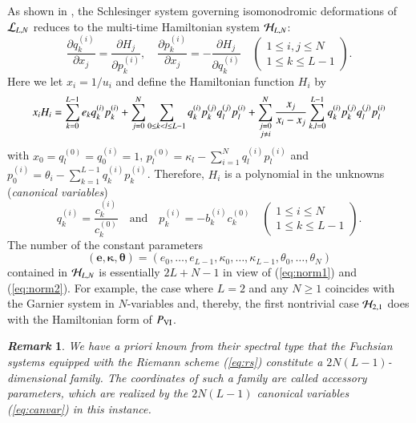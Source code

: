 \documentclass[12pt]{article}
\newtheorem{remark}[thm]{\it Remark}
\numberwithin{equation}{section}
\begin{document}
As shown in \cite{tsu14a}, 
the Schlesinger system 
governing isomonodromic deformations of ${\cal L}_{L,N}$
reduces to 
the multi-time Hamiltonian system
${\cal H}_{L,N}$:
\[
\frac{\partial q_k^{(i)}}{\partial x_j}=\frac{\partial H_j}{\partial p_k^{(i)}},
\quad 
\frac{\partial p_k^{(i)}}{\partial x_j}=-\frac{\partial H_j}{\partial q_k^{(i)}}
\quad 
\left(
\begin{array}{c}
 1 \leq i , j \leq N \\
1 \leq k \leq L-1
\end{array}
\right).
\]
Here we let $x_i=1/u_i$ and define 
the Hamiltonian function $H_i$ by
\[
x_i H_i=
\sum_{k=0}^{L-1} e_k q_k^{(i)} p_k^{(i)} 
+\sum_{j=0}^N \sum_{0 \leq k < l \leq L-1}
 q_k^{(i)}   p_k^{(j)} q_l^{(j)} p_l^{(i)} 
+\sum^N_{
\begin{subarray}{c} 
j=0  \\
j \neq i
\end{subarray}
}
\frac{x_j}{x_i-x_j} 
 \sum_{k,l=0}^{L-1}
 q_k^{(i)}   p_k^{(j)} q_l^{(j)} p_l^{(i)}
\]
with
$x_0=q_l^{(0)}
= q_0^{(i)}=1$, 
$p_l^{(0)}
=
\kappa_{l} - \sum_{i=1}^{N} q_l^{(i)} p_l^{(i)}$
and 
$p_0^{(i)}
=\theta_i-\sum_{k=1}^{L-1} q_k^{(i)} p_k^{(i)}$.
Therefore, 
$H_i$ is a polynomial in the 
unknowns ({\it canonical variables})
\begin{equation}
\label{eq:canvar}
q_k^{(i)}=\frac{c_k^{(i)}}{c_k^{(0)}} \quad \text{and} \quad 
p_k^{(i)}=-b_k^{(i)}c_k^{(0)}
\quad 
\left(
\begin{array}{c}
 1 \leq i \leq N \\
1 \leq k \leq L-1
\end{array}
\right).
\end{equation}
The number of 
the constant parameters
\begin{equation}
\label{eq:const}
({\boldsymbol e},{\boldsymbol \kappa},{\boldsymbol \theta})
=(e_0,\ldots,e_{L-1},\kappa_0,\ldots,\kappa_{L-1},\theta_0,\ldots,\theta_N)
\end{equation}
contained in ${\cal H}_{L,N}$
 is essentially $2L+N-1$
 in view of (\ref{eq:norm1}) and (\ref{eq:norm2}).
For example, the case where $L=2$ and any $N \geq 1$
coincides with the 
Garnier system in $N$-variables
and, thereby, the first nontrivial case ${\cal H}_{2,1}$ does with the Hamiltonian form of $P_{\rm VI}$.




\begin{remark}\rm
We have 
{\it a priori} known
from their spectral type 
that the Fuchsian systems equipped with
the Riemann scheme (\ref{eq:rs})
constitute a $2N(L-1)$-dimensional family.
The coordinates of such a family are called 
{\it accessory parameters},
which are realized by the $2N(L-1)$
canonical variables (\ref{eq:canvar})
in this instance.
\end{remark}
\end{document}
